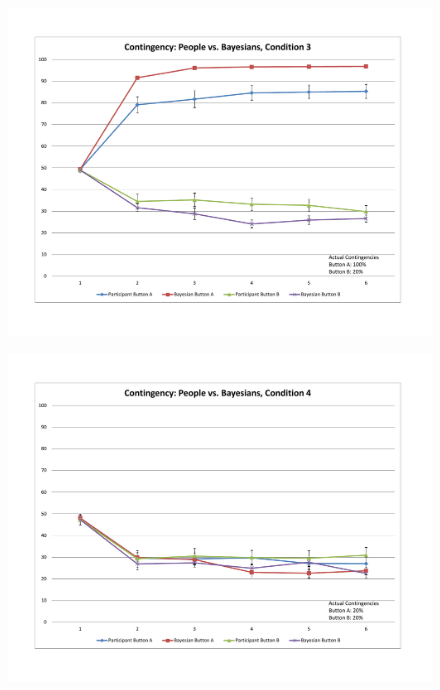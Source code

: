 \documentclass[USenglish,letterpaper,12pt,extrafontsizes,oneside,onecolumn,final]{memoir}
\begin{document}
  
\begin{figure}
\begin{center}
\includegraphics[width=\textwidth]{learning3}
\caption{\textsf{}\label{fig:learning3}}
\end{center}
\end{figure}

\begin{figure}
\begin{center}
\includegraphics[width=\textwidth]{learning4}
\caption{\textsf{}\label{fig:learning4}}
\end{center}
\end{figure}
 
\end{document}
